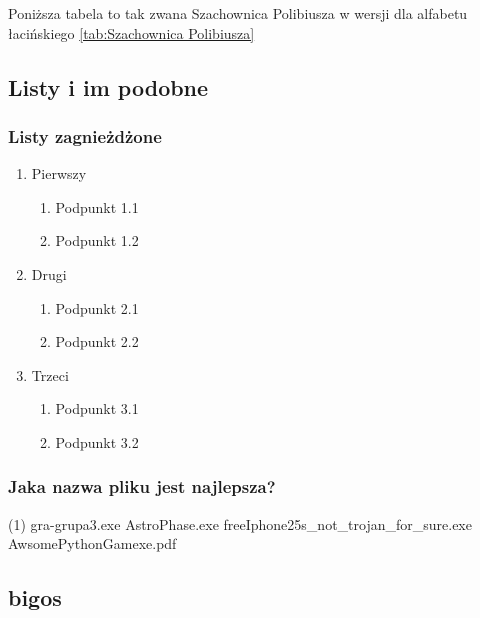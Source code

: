 Poniższa tabela to tak zwana Szachownica Polibiusza w wersji dla alfabetu łacińskiego \ref{tab:Szachownica Polibiusza}



\subsection{Listy i im podobne}

\subsubsection{Listy zagnieżdżone}

\begin{enumerate}
    \item Pierwszy
        \begin{enumerate}
            \item Podpunkt 1.1
                
            \item Podpunkt 1.2
        \end{enumerate}
    \item Drugi
        \begin{enumerate}
            \item Podpunkt 2.1
                
            \item Podpunkt 2.2
        \end{enumerate}
    \item Trzeci
        \begin{enumerate}
            \item Podpunkt 3.1
                
            \item Podpunkt 3.2
        \end{enumerate}
\end{enumerate}

\subsubsection*{Jaka nazwa pliku jest najlepsza?}

	\begin{tasks}(1)
		\task gra-grupa3.exe 
		\task AstroPhase.exe 
		\task freeIphone25s\_not\_trojan\_for\_sure.exe
		\task AwsomePythonGamexe.pdf 
	\end{tasks}

\subsection{bigos}


